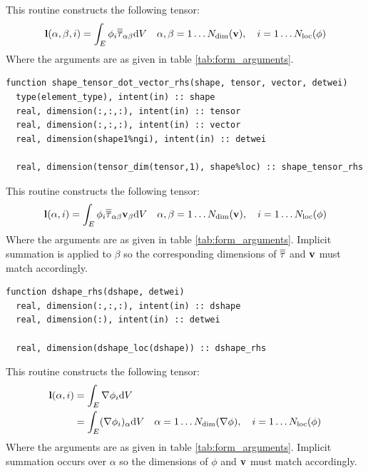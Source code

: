 \documentclass[a4paper, 11pt]{book}
\begin{document}
This routine constructs the following tensor:
\begin{equation}
  \mathbf{l}(\alpha, \beta, i)=\int_E \phi_{i}\overline{\overline{\tau}}_{\alpha\beta}\mathrm{d} V\quad
  \alpha,\beta=1\ldots N_\mathrm{dim}(\mathbf{v}),\quad i=1\ldots N_\mathrm{loc}(\phi)
\end{equation}
Where the arguments are as given in table \ref{tab:form_arguments}. 



\begin{lstlisting}
function shape_tensor_dot_vector_rhs(shape, tensor, vector, detwei)
  type(element_type), intent(in) :: shape
  real, dimension(:,:,:), intent(in) :: tensor
  real, dimension(:,:,:), intent(in) :: vector
  real, dimension(shape1%ngi), intent(in) :: detwei

  real, dimension(tensor_dim(tensor,1), shape%loc) :: shape_tensor_rhs
\end{lstlisting}

This routine constructs the following tensor:
\begin{equation}
  \mathbf{l}(\alpha, i)=\int_E \phi_{i}\overline{\overline{\tau}}_{\alpha\beta}\mathbf{v}_\beta\mathrm{d} V\quad
  \alpha,\beta=1\ldots N_\mathrm{dim}(\mathbf{v}),\quad i=1\ldots N_\mathrm{loc}(\phi)
\end{equation}
Where the arguments are as given in table \ref{tab:form_arguments}. Implicit
summation is applied to $\beta$ so the corresponding dimensions of
$\overline{\overline{\tau}}$ and $\mathbf{v}$ must match accordingly.



\begin{lstlisting}
function dshape_rhs(dshape, detwei)
  real, dimension(:,:,:), intent(in) :: dshape
  real, dimension(:), intent(in) :: detwei

  real, dimension(dshape_loc(dshape)) :: dshape_rhs 
\end{lstlisting}

This routine constructs the following tensor:
\begin{equation}
  \begin{split}
  \mathbf{l}(\alpha,i)&=\int_E \nabla\phi_{i} \mathrm{d} V\\
  &=\int_E (\nabla\phi_{i})_\alpha \mathrm{d} V\quad \alpha=1\ldots N_\mathrm{dim}(\nabla\phi),\quad i=1\ldots N_\mathrm{loc}(\phi)
  \end{split}
\end{equation}
Where the arguments are as given in table \ref{tab:form_arguments}. Implicit
summation occurs over $\alpha$ so the dimensions of $\phi$ and $\mathbf{v}$ must
match accordingly.
\end{document}
